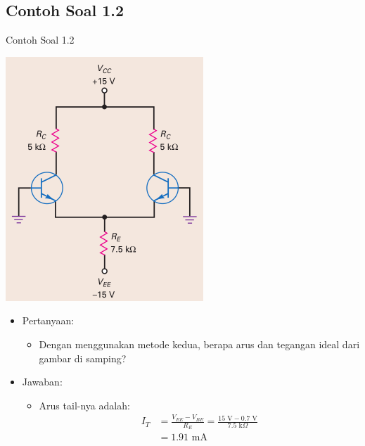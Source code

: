 \documentclass[aspectratio=169]{beamer}
\begin{document}
\subsection{Contoh Soal 1.2}
\begin{frame}{Contoh Soal 1.2}
	\begin{multicols}{2}
		\begin{center}
			\includegraphics[width=0.6\textheight]{gambar/01.latihan_soal_1a}
		\end{center}
		\columnbreak
		\begin{itemize}
			\item Pertanyaan:
			\begin{itemize}
				\item Dengan menggunakan metode kedua, berapa arus dan tegangan ideal dari gambar di samping?
			\end{itemize}
			\item Jawaban:
			\begin{itemize}
				\item Arus tail-nya adalah:
				\begin{align*}
					I_T &= \frac{V_{EE}-V_{BE}}{R_E} = \frac{15 \text{ V} - 0.7 \text{ V}}{7.5 \text{ k}\Omega} \\
					&= 1.91 \text{ mA}
				\end{align*}
			\end{itemize}
		\end{itemize}
		\vfill\null
	\end{multicols}
\end{frame}
\end{document}
